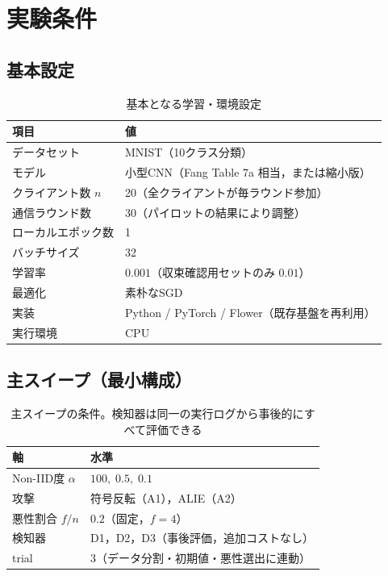 \documentclass[a4j, dvipdfmx]{jsarticle}  %
\begin{document}
\section{実験条件}

\subsection{基本設定}

\begin{table}[H]
\centering
\caption{基本となる学習・環境設定}
\begin{tabular}{ll}
\toprule
項目 & 値 \\
\midrule
データセット & MNIST（10クラス分類） \\
モデル & 小型CNN（Fang Table 7a 相当，または縮小版） \\
クライアント数 $n$ & 20（全クライアントが毎ラウンド参加） \\
通信ラウンド数 & 30（パイロットの結果により調整） \\
ローカルエポック数 & 1 \\
バッチサイズ & 32 \\
学習率 & $0.001$（収束確認用セットのみ $0.01$） \\
最適化 & 素朴なSGD \\
実装 & Python / PyTorch / Flower（既存基盤を再利用） \\
実行環境 & CPU \\
\bottomrule
\end{tabular}
\end{table}

\subsection{主スイープ（最小構成）}

\begin{table}[H]
\centering
\caption{主スイープの条件。検知器は同一の実行ログから事後的にすべて評価できる}
\begin{tabular}{ll}
\toprule
軸 & 水準 \\
\midrule
Non-IID度 $\alpha$ & $100,\; 0.5,\; 0.1$ \\
攻撃 & 符号反転（A1），ALIE（A2） \\
悪性割合 $f/n$ & $0.2$（固定，$f=4$） \\
検知器 & D1，D2，D3（事後評価，追加コストなし） \\
trial & $3$（データ分割・初期値・悪性選出に連動） \\
\bottomrule
\end{tabular}
\end{table}
\end{document}
